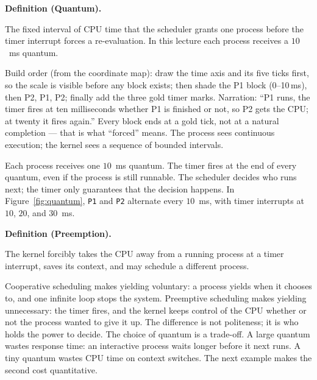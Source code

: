 \documentclass[11pt]{article}
\newenvironment{definitionbox}[1]{%
  \par\noindent\textbf{Definition (#1).}\ \itshape
}{\par\vspace{0.3em}}
\begin{document}
\begin{definitionbox}{Quantum}
The fixed interval of CPU time that the scheduler grants one process before the timer interrupt forces a re-evaluation. In this lecture each process receives a $10$~ms quantum.
\end{definitionbox}

Build order (from the coordinate map): draw the time axis and its five ticks first, so the scale is visible before any block exists; then shade the P1 block (0--10\,ms), then P2, P1, P2; finally add the three gold timer marks. Narration: ``P1 runs, the timer fires at ten milliseconds whether P1 is finished or not, so P2 gets the CPU; at twenty it fires again.'' Every block ends at a gold tick, not at a natural completion --- that is what ``forced'' means. The process sees continuous execution; the kernel sees a sequence of bounded intervals.

Each process receives one $10$~ms quantum. The timer fires at the end of every quantum, even if the process is still runnable. The scheduler decides who runs next; the timer only guarantees that the decision happens. In Figure~\ref{fig:quantum}, \texttt{P1} and \texttt{P2} alternate every $10$~ms, with timer interrupts at $10$, $20$, and $30$~ms.

\begin{definitionbox}{Preemption}
The kernel forcibly takes the CPU away from a running process at a timer interrupt, saves its context, and may schedule a different process.
\end{definitionbox}

Cooperative scheduling makes yielding voluntary: a process yields when it chooses to, and one infinite loop stops the system. Preemptive scheduling makes yielding unnecessary: the timer fires, and the kernel keeps control of the CPU whether or not the process wanted to give it up. The difference is not politeness; it is who holds the power to decide. The choice of quantum is a trade-off. A large quantum wastes response time: an interactive process waits longer before it next runs. A tiny quantum wastes CPU time on context switches. The next example makes the second cost quantitative.
\end{document}

